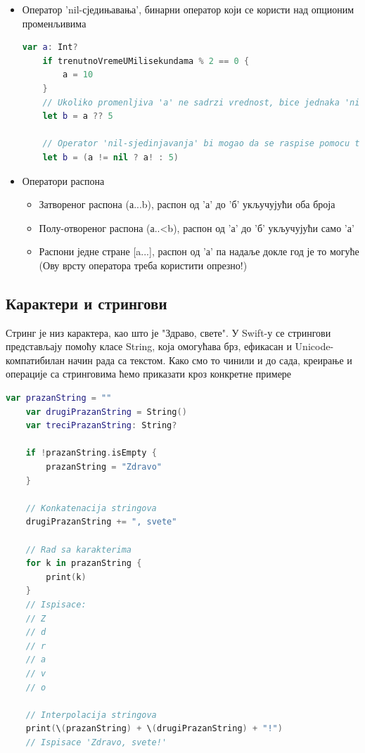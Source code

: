 \documentclass[12pt,oneside]{memoir}
\begin{document}
\begin{itemize}
    \item Оператор 'nil-сједињавања', бинарни оператор који се користи над опционим променљивима 
    
    \begin{lstlisting}[caption=\textit{{Тернарни оператор}}, label={lst:Тернарни оператор}, language=Swift, frame=single]
    var a: Int?
    if trenutnoVremeUMilisekundama % 2 == 0 {
        a = 10
    }
    // Ukoliko promenljiva 'a' ne sadrzi vrednost, bice jednaka 'nil' i promenljivoj 'b' bice dodeljena vrednost 5
    let b = a ?? 5
    
    // Operator 'nil-sjedinjavanja' bi mogao da se raspise pomocu ternarnog operatora:
    let b = (a != nil ? a! : 5)
    \end{lstlisting}
    
    \item Оператори распона
    
\begin{itemize}
    \item Затвореног распона (а...b), распон од 'а' до 'б' укључујући оба броја
    \item Полу-отвореног распона (а..<b), распон од 'а' до 'б' укључујући само 'а'
    \item Распони једне стране [a...], распон од 'а' па надаље докле год је то могуће (Ову врсту оператора треба користити опрезно!)
\end{itemize}

\end{itemize}

\subsection{Карактери и стрингови}

\indent Стринг је низ карактера, као што је "Здраво, свете". У Swift-у се стрингови представљају помоћу класе String, која омогућава брз, ефикасан и Unicode-компатибилан начин рада са текстом. 
\indent Како смо то чинили и до сада, креирање и операције са стринговима ћемо приказати кроз конкретне примере

\begin{lstlisting}[caption=\textit{{Операције над стринговима}}, label={lst:Операције над стринговима}, language=Swift, frame=single]
    var prazanString = ""
    var drugiPrazanString = String()
    var treciPrazanString: String?
    
    if !prazanString.isEmpty {
        prazanString = "Zdravo"
    }
    
    // Konkatenacija stringova
    drugiPrazanString += ", svete"
    
    // Rad sa karakterima
    for k in prazanString {
        print(k)
    }
    // Ispisace: 
    // Z
    // d
    // r
    // a
    // v
    // o
    
    // Interpolacija stringova
    print(\(prazanString) + \(drugiPrazanString) + "!")
    // Ispisace 'Zdravo, svete!'
\end{lstlisting}
\end{document}
